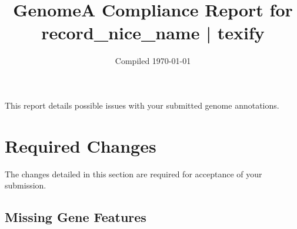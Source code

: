 \documentclass[]{article}
\date{Compiled \today}
\title{GenomeA Compliance Report for {{record_nice_name | texify}}}
\begin{document}
\maketitle
This report details possible issues with your submitted genome annotations.

\section{Required Changes}

The changes detailed in this section are required for acceptance of your
submission.

\subsection{Missing Gene Features}
\end{document}

